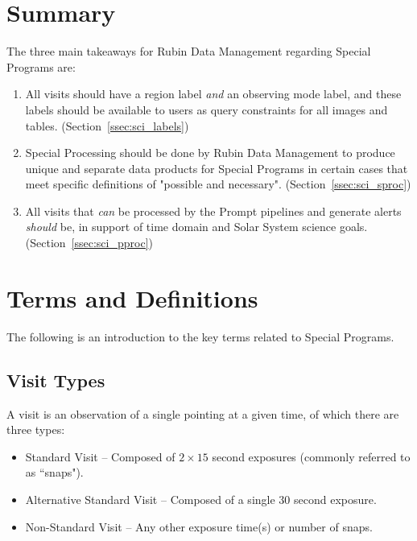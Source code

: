 \section{Summary} \label{sec:mem}

The three main takeaways for Rubin Data Management regarding Special Programs are:

\begin{enumerate}

\item All visits should have a region label \textit{and} an observing mode
label, and these labels should be available to users as query constraints for
all images and tables.
(Section~\ref{ssec:sci_labels})

\item Special Processing should be done by Rubin Data Management to
produce unique and separate data products for Special Programs in
certain cases that meet specific definitions of "possible and necessary".
(Section~\ref{ssec:sci_sproc})

\item All visits that \emph{can} be processed by the Prompt pipelines and generate
alerts \emph{should} be, in support of time domain and Solar System science goals.
(Section~\ref{ssec:sci_pproc})

\end{enumerate}

\section{Terms and Definitions}\label{sec:intro}

The following is an introduction to the key terms related to Special Programs.

\subsection{Visit Types}

A visit is an observation of a single pointing at a given time, of which
there are three types:

\begin{itemize}
\item Standard Visit -- Composed of $2\times15$ second exposures (commonly referred to as ``snaps").
\item Alternative Standard Visit -- Composed of a single $30$ second exposure.
\item Non-Standard Visit -- Any other exposure time(s) or number of snaps.
\end{itemize}

